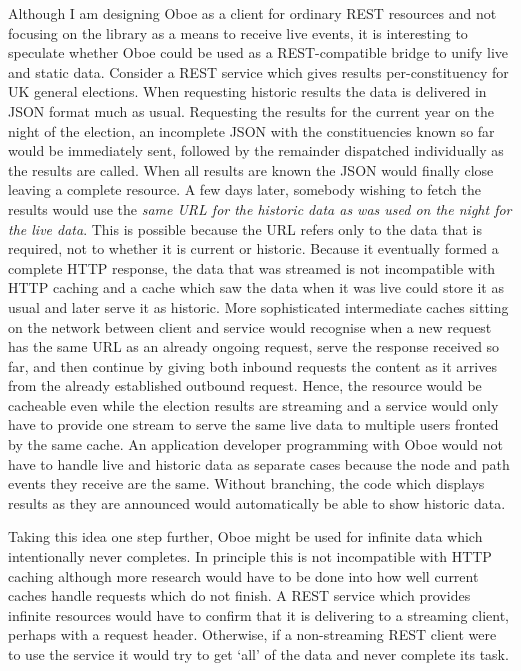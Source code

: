 \documentclass[12pt, ]{article}
\begin{document}
Although I am designing Oboe as a client for ordinary REST resources and
not focusing on the library as a means to receive live events, it is
interesting to speculate whether Oboe could be used as a REST-compatible
bridge to unify live and static data. Consider a REST service which
gives results per-constituency for UK general elections. When requesting
historic results the data is delivered in JSON format much as usual.
Requesting the results for the current year on the night of the
election, an incomplete JSON with the constituencies known so far would
be immediately sent, followed by the remainder dispatched individually
as the results are called. When all results are known the JSON would
finally close leaving a complete resource. A few days later, somebody
wishing to fetch the results would use the \emph{same URL for the
historic data as was used on the night for the live data}. This is
possible because the URL refers only to the data that is required, not
to whether it is current or historic. Because it eventually formed a
complete HTTP response, the data that was streamed is not incompatible
with HTTP caching and a cache which saw the data when it was live could
store it as usual and later serve it as historic. More sophisticated
intermediate caches sitting on the network between client and service
would recognise when a new request has the same URL as an already
ongoing request, serve the response received so far, and then continue
by giving both inbound requests the content as it arrives from the
already established outbound request. Hence, the resource would be
cacheable even while the election results are streaming and a service
would only have to provide one stream to serve the same live data to
multiple users fronted by the same cache. An application developer
programming with Oboe would not have to handle live and historic data as
separate cases because the node and path events they receive are the
same. Without branching, the code which displays results as they are
announced would automatically be able to show historic data.

Taking this idea one step further, Oboe might be used for infinite data
which intentionally never completes. In principle this is not
incompatible with HTTP caching although more research would have to be
done into how well current caches handle requests which do not finish. A
REST service which provides infinite resources would have to confirm
that it is delivering to a streaming client, perhaps with a request
header. Otherwise, if a non-streaming REST client were to use the
service it would try to get `all' of the data and never complete its
task.
\end{document}
